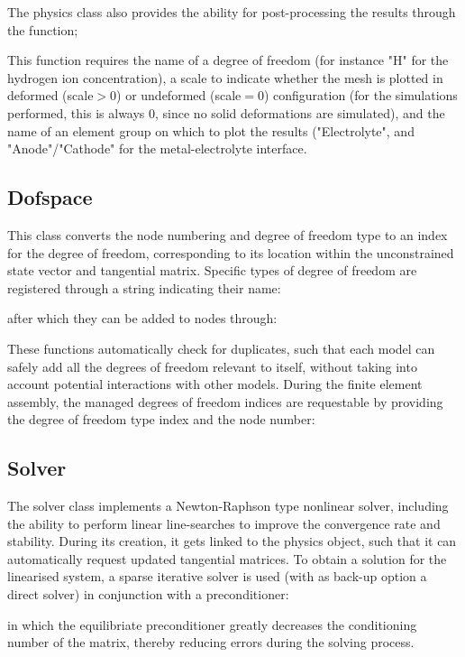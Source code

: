 \documentclass[3p]{elsarticle} %
\begin{document}
The physics class also provides the ability for post-processing the results through the function;

This function requires the name of a degree of freedom (for instance "H" for the hydrogen ion concentration), a scale to indicate whether the mesh is plotted in deformed (scale$>$0) or undeformed (scale$=$0) configuration (for the simulations performed, this is always $0$, since no solid deformations are simulated), and the name of an element group on which to plot the results ("Electrolyte", and "Anode"/"Cathode" for the metal-electrolyte interface.

\subsection{Dofspace}
This class converts the node numbering and degree of freedom type to an index for the degree of freedom, corresponding to its location within the unconstrained state vector and tangential matrix. Specific types of degree of freedom are registered through a string indicating their name:

after which they can be added to nodes through:

These functions automatically check for duplicates, such that each model can safely add all the degrees of freedom relevant to itself, without taking into account potential interactions with other models. During the finite element assembly, the managed degrees of freedom indices are requestable by providing the degree of freedom type index and the node number:


\subsection{Solver}
The solver class implements a Newton-Raphson type nonlinear solver, including the ability to perform linear line-searches to improve the convergence rate and stability. During its creation, it gets linked to the physics object, such that it can automatically request updated tangential matrices. To obtain a solution for the linearised system, a sparse iterative solver is used (with as back-up option a direct solver) in conjunction with a preconditioner:

in which the equilibriate preconditioner greatly decreases the conditioning number of the matrix, thereby reducing errors during the solving process. 
\end{document}
